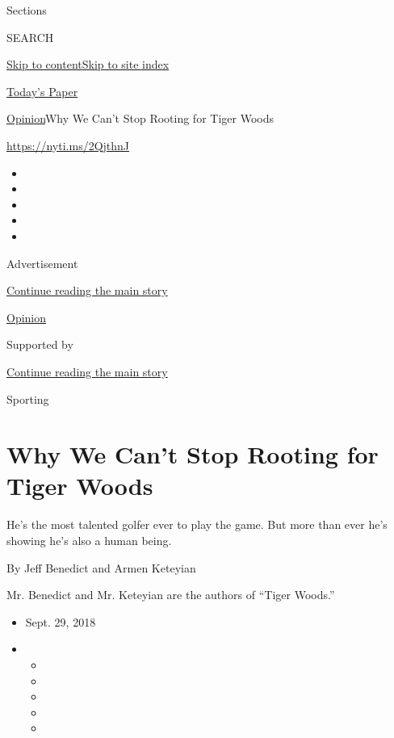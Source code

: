 Sections

SEARCH

\protect\hyperlink{site-content}{Skip to
content}\protect\hyperlink{site-index}{Skip to site index}

\href{https://myaccount.nytimes3xbfgragh.onion/auth/login?response_type=cookie\&client_id=vi}{}

\href{https://www.nytimes3xbfgragh.onion/section/todayspaper}{Today's
Paper}

\href{/section/opinion}{Opinion}\textbar{}Why We Can't Stop Rooting for
Tiger Woods

\url{https://nyti.ms/2QjthnJ}

\begin{itemize}
\item
\item
\item
\item
\item
\end{itemize}

Advertisement

\protect\hyperlink{after-top}{Continue reading the main story}

\href{/section/opinion}{Opinion}

Supported by

\protect\hyperlink{after-sponsor}{Continue reading the main story}

Sporting

\hypertarget{why-we-cant-stop-rooting-for-tiger-woods}{%
\section{Why We Can't Stop Rooting for Tiger
Woods}\label{why-we-cant-stop-rooting-for-tiger-woods}}

He's the most talented golfer ever to play the game. But more than ever
he's showing he's also a human being.

By Jeff Benedict and Armen Keteyian

Mr. Benedict and Mr. Keteyian are the authors of ``Tiger Woods.''

\begin{itemize}
\item
  Sept. 29, 2018
\item
  \begin{itemize}
  \item
  \item
  \item
  \item
  \item
  \end{itemize}
\end{itemize}

